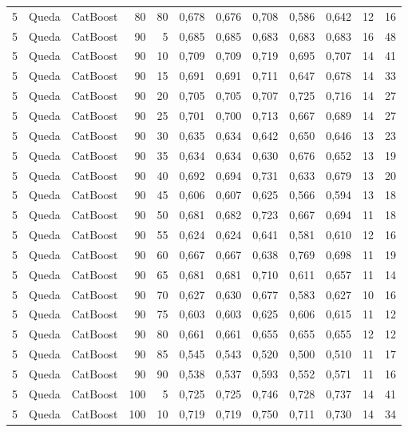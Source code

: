 \begin{longtable}{@{}rllrrrrrrrrr@{}}
5 & Queda & CatBoost & 80 & 80 & 0,678 & 0,676 & 0,708 & 0,586 & 0,642 & 12 & 16 \\
5 & Queda & CatBoost & 90 & 5 & 0,685 & 0,685 & 0,683 & 0,683 & 0,683 & 16 & 48 \\
5 & Queda & CatBoost & 90 & 10 & 0,709 & 0,709 & 0,719 & 0,695 & 0,707 & 14 & 41 \\
5 & Queda & CatBoost & 90 & 15 & 0,691 & 0,691 & 0,711 & 0,647 & 0,678 & 14 & 33 \\
5 & Queda & CatBoost & 90 & 20 & 0,705 & 0,705 & 0,707 & 0,725 & 0,716 & 14 & 27 \\
5 & Queda & CatBoost & 90 & 25 & 0,701 & 0,700 & 0,713 & 0,667 & 0,689 & 14 & 27 \\
5 & Queda & CatBoost & 90 & 30 & 0,635 & 0,634 & 0,642 & 0,650 & 0,646 & 13 & 23 \\
5 & Queda & CatBoost & 90 & 35 & 0,634 & 0,634 & 0,630 & 0,676 & 0,652 & 13 & 19 \\
5 & Queda & CatBoost & 90 & 40 & 0,692 & 0,694 & 0,731 & 0,633 & 0,679 & 13 & 20 \\
5 & Queda & CatBoost & 90 & 45 & 0,606 & 0,607 & 0,625 & 0,566 & 0,594 & 13 & 18 \\
5 & Queda & CatBoost & 90 & 50 & 0,681 & 0,682 & 0,723 & 0,667 & 0,694 & 11 & 18 \\
5 & Queda & CatBoost & 90 & 55 & 0,624 & 0,624 & 0,641 & 0,581 & 0,610 & 12 & 16 \\
5 & Queda & CatBoost & 90 & 60 & 0,667 & 0,667 & 0,638 & 0,769 & 0,698 & 11 & 19 \\
5 & Queda & CatBoost & 90 & 65 & 0,681 & 0,681 & 0,710 & 0,611 & 0,657 & 11 & 14 \\
5 & Queda & CatBoost & 90 & 70 & 0,627 & 0,630 & 0,677 & 0,583 & 0,627 & 10 & 16 \\
5 & Queda & CatBoost & 90 & 75 & 0,603 & 0,603 & 0,625 & 0,606 & 0,615 & 11 & 12 \\
5 & Queda & CatBoost & 90 & 80 & 0,661 & 0,661 & 0,655 & 0,655 & 0,655 & 12 & 12 \\
5 & Queda & CatBoost & 90 & 85 & 0,545 & 0,543 & 0,520 & 0,500 & 0,510 & 11 & 17 \\
5 & Queda & CatBoost & 90 & 90 & 0,538 & 0,537 & 0,593 & 0,552 & 0,571 & 11 & 16 \\
5 & Queda & CatBoost & 100 & 5 & 0,725 & 0,725 & 0,746 & 0,728 & 0,737 & 14 & 41 \\
5 & Queda & CatBoost & 100 & 10 & 0,719 & 0,719 & 0,750 & 0,711 & 0,730 & 14 & 34 \\

\end{longtable}
